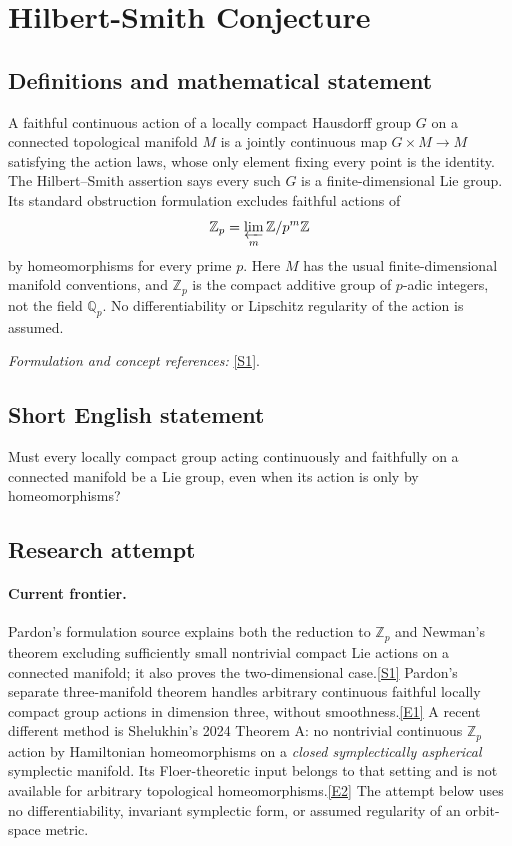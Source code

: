 \documentclass[11pt,a4paper]{article}
\newcommand{\Z}{\mathbb{Z}}
\newcommand{\Q}{\mathbb{Q}}
\newcommand{\sref}[2]{\hyperlink{source:#1:#2}{[S#2]}}
\newcommand{\eref}[2]{\hyperlink{extra:#1:#2}{[E#2]}}
\newif\ifshowcatalogue
\newcommand{\cataloguescope}[1]{\ifshowcatalogue
 \paragraph{Exact scope in the supplied catalogue.}
 \begin{quote}\small #1\end{quote}\fi}
\begin{document}
\setcounter{section}{0}
\clearpage
\section*{\texorpdfstring{Hilbert-Smith Conjecture}{Hilbert-Smith Conjecture}}\label{statement}
\subsection{Definitions and mathematical statement}
A faithful continuous action of a locally compact Hausdorff group $G$ on a connected topological manifold $M$ is a jointly continuous map $G\times M\to M$ satisfying the action laws, whose only element fixing every point is the identity. The Hilbert--Smith assertion says every such $G$ is a finite-dimensional Lie group. Its standard obstruction formulation excludes faithful actions of
\[
 \Z_p=\varprojlim_m\Z/p^m\Z
\]
by homeomorphisms for every prime $p$. Here $M$ has the usual finite-dimensional manifold conventions, and $\Z_p$ is the compact additive group of $p$-adic integers, not the field $\Q_p$. No differentiability or Lipschitz regularity of the action is assumed.
\par\smallskip\textit{Formulation and concept references:} \sref{statement}{1}.
\cataloguescope{Prove that every locally compact topological group acting faithfully on a connected topological manifold is a Lie group; equivalently, prove that Z\_p admits no faithful action by homeomorphisms on a connected manifold.}
\subsection{Short English statement}
Must every locally compact group acting continuously and faithfully on a connected manifold be a Lie group, even when its action is only by homeomorphisms?
\subsection{Research attempt}

\paragraph{Current frontier.}
Pardon's formulation source explains both the reduction to $\Z_p$ and
Newman's theorem excluding sufficiently small nontrivial compact Lie
actions on a connected manifold; it also proves the two-dimensional
case.\sref{statement}{1}
Pardon's separate three-manifold theorem handles arbitrary continuous
faithful locally compact group actions in dimension three, without
smoothness.\eref{statement}{1}
A recent different method is Shelukhin's 2024 Theorem A: no nontrivial
continuous $\Z_p$ action by Hamiltonian homeomorphisms on a \emph{closed
symplectically aspherical} symplectic manifold. Its Floer-theoretic input
belongs to that setting and is not available for arbitrary topological
homeomorphisms.\eref{statement}{2}
The attempt below uses no differentiability, invariant symplectic form,
or assumed regularity of an orbit-space metric.
\end{document}

